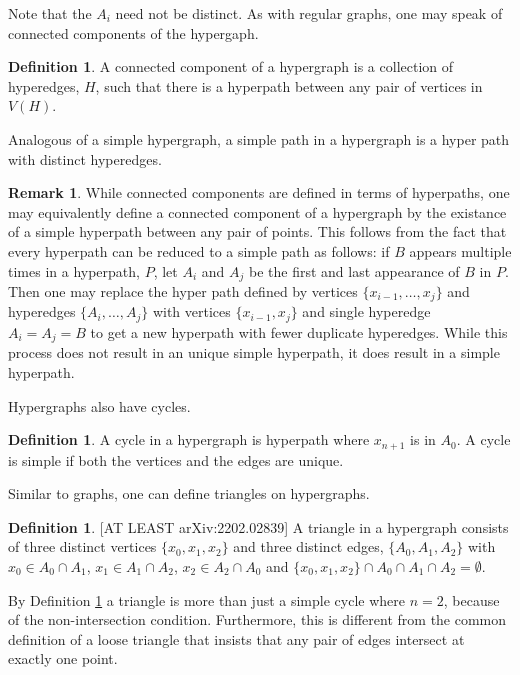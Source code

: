 \documentclass[11pt]{article}
\theoremstyle{remark}
\theoremstyle{definition}
\newtheorem{dfn}[thm]{Definition}
\newtheorem{rmk}[thm]{Remark}
\begin{document}
Note that the $A_i$ need not be distinct. As with regular graphs, one may speak of connected components of the hypergaph. 

\begin{dfn} \label{dfn:hyperedge}A connected component of a hypergraph is a collection of hyperedges, $H$, such that there is a hyperpath between any pair of vertices in $V(H)$. \end{dfn}

Analogous of a simple hypergraph, a simple path in a hypergraph is a hyper path with distinct hyperedges.

\begin{rmk} \label{rmk:hyperpathscontainsimple} While connected components are defined in terms of hyperpaths, one may equivalently define a connected component of a hypergraph by the existance of a simple hyperpath between any pair of points. This follows from the fact that every hyperpath can be reduced to a simple path as follows: if $B$ appears multiple times in a hyperpath, $P$, let $A_i$ and $A_j$ be the first and last appearance of $B$ in $P$. Then one may replace the hyper path defined by vertices $\{x_{i-1}, \ldots , x_j\}$ and hyperedges $\{A_i, \ldots, A_j\}$ with vertices $\{x_{i-1}, x_j\}$ and single hyperedge $A_i = A_j = B$ to get a new hyperpath with fewer duplicate hyperedges. While this process does not result in an unique simple hyperpath, it does result in a simple hyperpath. \end{rmk}

Hypergraphs also have cycles.

\begin{dfn} \label{dfn:hypercycles}
	A cycle in a hypergraph is hyperpath where $x_{n+1}$ is in $A_0$. A cycle is simple if both the vertices and the edges are unique. 
\end{dfn}

Similar to graphs, one can define triangles on hypergraphs.

\begin{dfn} \label{dfn:hypertriangle} [AT LEAST arXiv:2202.02839]
A triangle in a hypergraph consists of three distinct vertices $\{x_0, x_1, x_2\}$ and three distinct edges, $\{A_0, A_1, A_2\}$ with $x_0 \in A_0 \cap A_1$, $x_1 \in A_1 \cap A_2$, $x_2 \in A_2 \cap A_0$ and $\{x_0, x_1, x_2\} \cap A_0 \cap A_1 \cap A_2 = \emptyset$. 
\end{dfn}

By Definition \ref{dfn:hypertriangle} a triangle is more than just a simple cycle where $n = 2$, because of the non-intersection condition. Furthermore, this is different from the common definition of a loose triangle that insists that any pair of edges intersect at exactly one point. 
\end{document}
